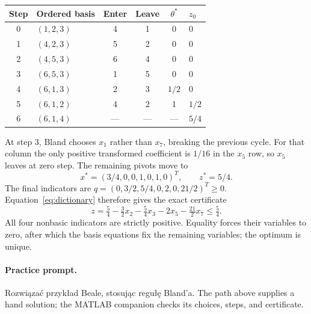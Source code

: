 \documentclass[11pt,a4paper]{article}
\begin{document}
\begin{center}
  \begin{tabular}{clcccl}\toprule
    Step & Ordered basis & Enter & Leave & $\theta^*$ & $z_0$\\\midrule
    0 & $(1,2,3)$ & 4 & 1 & 0 & 0\\
    1 & $(4,2,3)$ & 5 & 2 & 0 & 0\\
    2 & $(4,5,3)$ & 6 & 4 & 0 & 0\\
    3 & $(6,5,3)$ & 1 & 5 & 0 & 0\\
    4 & $(6,1,3)$ & 2 & 3 & $1/2$ & 0\\
    5 & $(6,1,2)$ & 4 & 2 & 1 & $1/2$\\
    6 & $(6,1,4)$ & --- & --- & --- & $5/4$\\\bottomrule
  \end{tabular}
\end{center}
At step 3, Bland chooses $x_1$ rather than $x_7$, breaking the previous cycle.
For that column the only positive transformed coefficient is $1/16$ in the
$x_5$ row, so $x_5$ leaves at zero step. The remaining pivots move to
\[
  x^*=(3/4,0,0,1,0,1,0)^T,\qquad z^*=5/4.
\]
The final indicators are $q=(0,3/2,5/4,0,2,0,21/2)^T\geq0$.
Equation~\eqref{eq:dictionary} therefore gives the exact certificate
\begin{equation}\label{eq:beale-certificate}
  z=\tfrac54-\tfrac32x_2-\tfrac54x_3-2x_5-\tfrac{21}{2}x_7\leq\tfrac54.
\end{equation}
All four nonbasic indicators are strictly positive. Equality forces their
variables to zero, after which the basis equations fix the remaining variables;
the optimum is unique.
\paragraph{Practice prompt.}
\foreignlanguage{polish}{Rozwiązać przykład Beale, stosując regułę Bland'a.}
The path above supplies a hand solution; the MATLAB companion checks its choices,
steps, and certificate.

\end{document}
